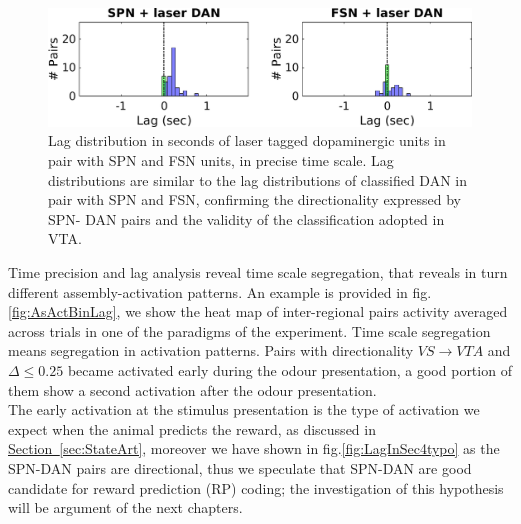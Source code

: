 \begin{figure}[H]
\centering
\includegraphics[scale=0.5]{figures/LagSecLaser3VS.png}
\caption{Lag distribution in seconds of laser tagged dopaminergic units in pair with SPN and FSN units, in precise time scale. Lag distributions are similar to the lag distributions of classified DAN in pair with SPN and FSN, confirming the directionality expressed by SPN- DAN pairs and the validity of the classification adopted in VTA.}
\label{fig:LagInSecLaser}
\end{figure}
Time precision and lag analysis reveal time scale segregation, that reveals in turn different assembly-activation patterns. An example is provided in fig.\ref{fig:AsActBinLag}, we show the heat map of inter-regional pairs activity averaged across trials in one of the paradigms of the experiment. Time scale segregation means segregation in activation patterns. Pairs with directionality $VS \rightarrow VTA$ and $\Delta \le 0.25$ became activated early during the odour presentation, a good portion of them show a second activation after the odour presentation.\\The early activation at the stimulus presentation is the type of activation we expect when the animal predicts the reward, as discussed in \hyperref[sec:StateArt]{Section~\ref*{sec:StateArt}}, moreover we have shown in fig.\ref{fig:LagInSec4typo} as the SPN-DAN pairs are directional, thus we speculate that SPN-DAN are good candidate for reward prediction (RP) coding; the investigation of this hypothesis will be argument of the next chapters.\\
